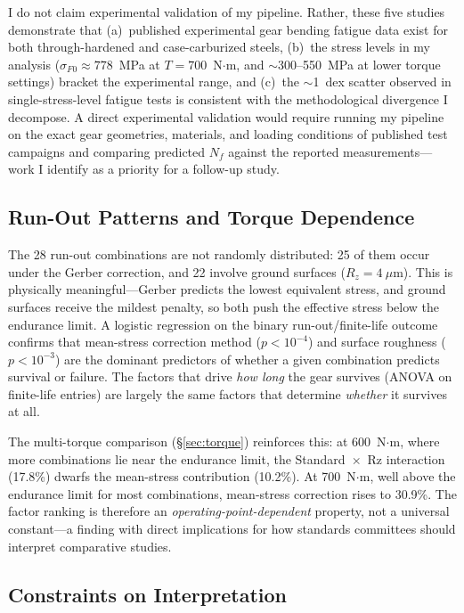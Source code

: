 \documentclass[12pt,a4paper]{article}
\begin{document}
I do not claim experimental validation of my pipeline. Rather, these
five studies demonstrate that (a)~published experimental gear bending
fatigue data exist for both through-hardened and case-carburized steels,
(b)~the stress levels in my analysis ($\sigma_{F0} \approx 778$~MPa
at $T{=}700$~N$\cdot$m, and $\sim$300--550~MPa at lower torque
settings) bracket the experimental range, and (c)~the $\sim$1~dex
scatter observed in single-stress-level fatigue tests is consistent
with the methodological divergence I decompose. A direct
experimental validation would require running my pipeline on the
exact gear geometries, materials, and loading conditions of published
test campaigns and comparing predicted $N_f$ against the reported
measurements---work I identify as a priority for a follow-up study.

\subsection{Run-Out Patterns and Torque Dependence}

The 28 run-out combinations are not randomly distributed: 25 of them
occur under the Gerber correction, and 22 involve ground surfaces
($R_z = 4~\mu$m). This is physically meaningful---Gerber predicts the
lowest equivalent stress, and ground surfaces receive the mildest
penalty, so both push the effective stress below the endurance limit.
A logistic regression on the binary run-out/finite-life outcome
confirms that mean-stress correction method ($p < 10^{-4}$) and
surface roughness ($p < 10^{-3}$) are the dominant predictors of
whether a given combination predicts survival or failure. The factors
that drive \emph{how long} the gear survives (ANOVA on finite-life
entries) are largely the same factors that determine \emph{whether} it
survives at all.

The multi-torque comparison (\S\ref{sec:torque}) reinforces this:
at 600~N$\cdot$m, where more combinations lie near the endurance
limit, the Standard~$\times$~Rz interaction (17.8\%) dwarfs the
mean-stress contribution (10.2\%). At 700~N$\cdot$m, well above the
endurance limit for most combinations, mean-stress correction rises to
30.9\%. The factor ranking is therefore an \emph{operating-point-dependent}
property, not a universal constant---a finding with direct implications
for how standards committees should interpret comparative studies.

\subsection{Constraints on Interpretation}
\end{document}
